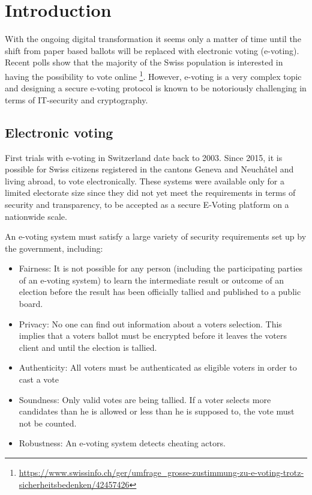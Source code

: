 \chapter{Introduction}
With the ongoing digital transformation it seems only a matter of time until the shift from paper based ballots will be replaced with electronic voting (e-voting). Recent polls show that the majority of the Swiss population is interested in having the possibility to vote online \footnote{\url{https://www.swissinfo.ch/ger/umfrage_grosse-zustimmung-zu-e-voting-trotz-sicherheitsbedenken/42457426}}. However, e-voting is a very complex topic and designing a secure e-voting protocol is known to be notoriously challenging in terms of IT-security and cryptography.

\section{Electronic voting}
First trials with e-voting in Switzerland date back to 2003. Since 2015, it is possible for Swiss citizens registered in the cantons Geneva and Neuchâtel and living abroad, to vote electronically. These systems were available only for a limited electorate size since they did not yet meet the requirements in terms of security and transparency, to be accepted as a secure E-Voting platform on a nationwide scale.

An e-voting system must satisfy a large variety of security requirements set up by the government, including:

\begin{itemize}
	\item Fairness: It is not possible for any person (including the participating parties of an e-voting system) to learn the intermediate result or outcome of an election before the result has been officially tallied and published to a public board.
	\item Privacy: No one can find out information about a voters selection. This implies that a voters ballot must be encrypted before it leaves the voters client and until the election is tallied.
	\item Authenticity: All voters must be authenticated as eligible voters in order to cast a vote
	\item Soundness: Only valid votes are being tallied. If a voter selects more candidates than he is allowed or less than he is supposed to, the vote must not be counted.
	\item Robustness: An e-voting system detects cheating actors.
\end{itemize}

